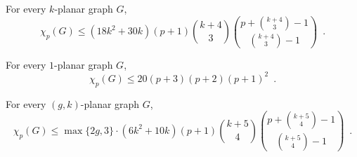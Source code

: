 \documentclass{patmorin}
\newcommand{\note}[2]{{\color{red}[#1:~#2]}}
\renewcommand{\ge}{\geqslant}
\renewcommand{\le}{\leqslant}
\renewcommand{\leq}{\leqslant}
\newcommand{\treewidth}{\ensuremath{\binom{k+4}{3}}-1}
\begin{document}

\begin{cor}
\label{pck}
For every $k$-planar graph $G$, 
$$\chi_p(G)\le (18k^2+30k)(p+1) \binom{k+4}{3} \binom{p+ \binom{k+4}{3}-1}{ \binom{k+4}{3}-1}\enspace.$$
\end{cor}

\begin{cor}
\label{pc1}
For every $1$-planar graph $G$, 
$$\chi_p(G)\le 20 (p+3)(p+2)(p+1)^2\enspace.$$
\end{cor}

\begin{cor}
\label{pcgk}
For every $(g,k)$-planar graph $G$,  
$$\chi_p(G) \le \max\{2g,3\}\cdot(6k^2 + 10k) (p+1) \binom{k+5}{4}\binom{p+\binom{k+5}{4}-1}{\binom{k+5}{4}-1}\enspace.$$
\end{cor}

\end{document}
